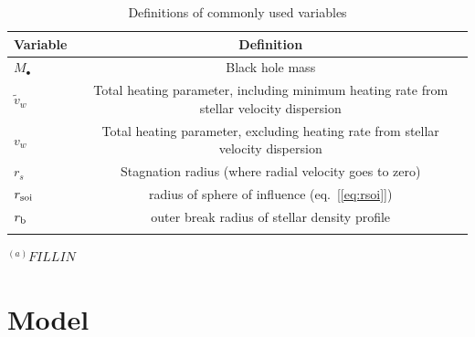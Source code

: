 \documentclass[usenatbib,fleqn]{mn2e}
\begin{document}
\begin{table}
\begin{threeparttable}
\begin{minipage}{18cm}
\caption{Definitions of commonly used variables}
\begin{tabular}{lc}
\hline
{Variable} & {Definition} \\
\hline
$M_{\bullet}$ & Black hole mass \\
$\tilde{v}_{w}$ & Total heating parameter, including minimum heating rate from stellar velocity dispersion \\
$v_{w}$ & Total heating parameter, excluding heating rate from stellar velocity dispersion \\
$r_{s}$ & Stagnation radius (where radial velocity goes to zero) \\
$r_{\rm soi}$ & radius of sphere of influence (eq.~[\ref{eq:rsoi}]) \\
$r_{\rm b}$ & outer break radius of stellar density profile \\  
\hline
\label{table:definitions}  
\end{tabular}
\begin{tablenotes}
\item{$^{(a)}FILL IN$}
\end{tablenotes}
\end{minipage}
\end{threeparttable}

\end{table}


\section{Model}
\label{sec:model}
\end{document}
